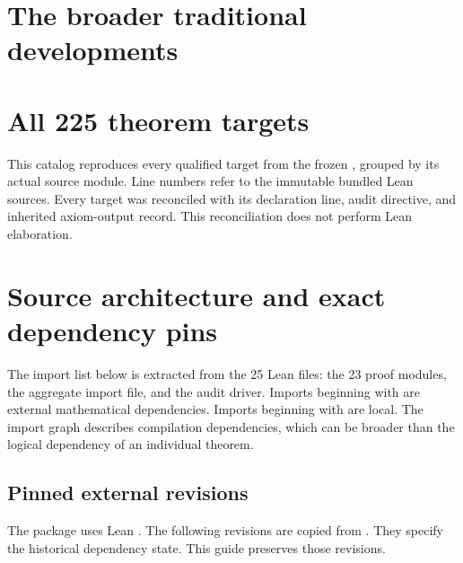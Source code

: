\section{The broader traditional developments}
\label{sec:extension}


\clearpage
\section{All 225 theorem targets}
\label{sec:targets}
This catalog reproduces every qualified target from the frozen , grouped by its actual source module. Line numbers refer to the immutable bundled Lean sources. Every target was reconciled with its declaration line, audit directive, and inherited axiom-output record. This reconciliation does not perform Lean elaboration.

\clearpage
\section{Source architecture and exact dependency pins}
\label{sec:imports}
The import list below is extracted from the 25 Lean files: the 23 proof modules, the aggregate import file, and the audit driver. Imports beginning with  are external mathematical dependencies. Imports beginning with  are local. The import graph describes compilation dependencies, which can be broader than the logical dependency of an individual theorem.

\subsection{Pinned external revisions}
The package uses Lean . The following revisions are copied from . They specify the historical dependency state. This guide preserves those revisions.


